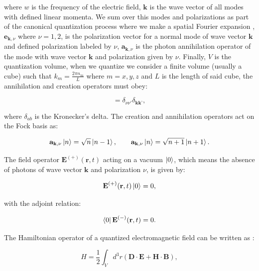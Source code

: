 \documentclass[12pt]{book}
\begin{document}
where $w$ is the frequency of the electric field, $\mathbf{k}$ is the wave vector of all modes with defined linear momenta. We sum over this modes and polarizations as part of the canonical quantization process where we make a spatial Fourier expansion \cite{grynberg}, $\mathbf{e}_{\textbf{k},\nu}$ where $\nu=1,2$, is the polarization vector for a normal mode of wave vector $\mathbf{k}$ and defined polarization labeled by $\nu$, $\mathbf{a}_{\textbf{k},\nu}$ is the photon annihilation operator of the mode with wave vector $\mathbf{k}$ and polarization given by $\nu$. Finally, $V$ is the quantization volume, when we quantize we consider a finite volume (usually a cube) such that $k_{m}=\frac{2 \pi n_{m}}{L}$ where $m=x,y,z$ and $L$ is the length of said cube, the annihilation and creation operators must obey:

\begin{equation}
[\mathbf{a}_{\textbf{k},\nu},\mathbf{a^{\dagger}}_{\textbf{k},\nu}]=\delta_{\nu \nu'}\delta_{\textbf{k}\textbf{k'}},
\end{equation}

where $\delta_{ab}$ is the Kronecker's delta. The creation and annihilation operators act on the Fock basis as:

\begin{equation}
    \mathbf{a}_{\textbf{k},\nu}\ket{n}=\sqrt{n}\ket{n-1},\qquad
    \mathbf{a}_{\textbf{k},\nu}\ket{n}=\sqrt{n+1}\ket{n+1}.\label{Fock}
\end{equation}

The field operator $\textbf{E}^{(+)} (\textbf{r},t)$ acting on a vacuum $\ket{0}$, which means the absence of photons of wave vector $\mathbf{k}$ and polarization $\nu$, is given by:

\begin{equation}
\textbf{E}^{(+)} (\textbf{r},t)\ket{0}=0,
\end{equation}

 with the adjoint relation:

\begin{equation}
\bra{0}\textbf{E}^{(-)} (\textbf{r},t)=0.
\end{equation}

The Hamiltonian operator of a quantized electromagnetic field can be written as \cite{jackson}:

\begin{equation}
H=\frac{1}{2}\int_{V} d^{3}r (\mathbf{D \cdot E}+\mathbf{H \cdot B}),
\end{equation}
\end{document}
